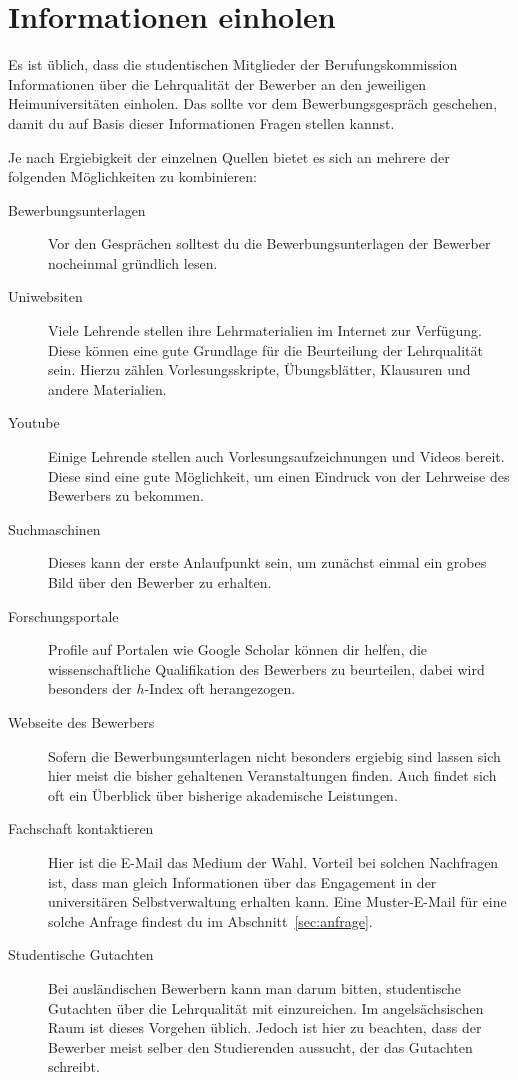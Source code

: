 \section{Informationen einholen}
Es ist üblich, dass die studentischen Mitglieder der Berufungskommission Informationen über die Lehrqualität der Bewerber an den jeweiligen Heimuniversitäten einholen.
Das sollte vor dem Bewerbungsgespräch geschehen, damit du auf Basis dieser Informationen Fragen stellen kannst.

Je nach Ergiebigkeit der einzelnen Quellen bietet es sich an mehrere der folgenden Möglichkeiten zu kombinieren:
\begin{description}
      \item [Bewerbungsunterlagen]
            Vor den Gesprächen solltest du die Bewerbungsunterlagen der Bewerber nocheinmal gründlich lesen.
      \item [Uniwebsiten]
            Viele Lehrende stellen ihre Lehrmaterialien im Internet zur Verfügung. Diese können eine gute Grundlage für die Beurteilung der Lehrqualität sein. Hierzu zählen Vorlesungsskripte, Übungsblätter, Klausuren und andere Materialien.
      \item [Youtube]
            Einige Lehrende stellen auch Vorlesungsaufzeichnungen und Videos bereit. Diese sind eine gute Möglichkeit, um einen Eindruck von der Lehrweise des Bewerbers zu bekommen.
      \item [Suchmaschinen]
            Dieses kann der erste Anlaufpunkt sein, um zunächst einmal ein grobes Bild über den Bewerber zu erhalten.
      \item [Forschungsportale]
            Profile auf Portalen wie Google Scholar können dir helfen, die wissenschaftliche Qualifikation des Bewerbers zu beurteilen, dabei wird besonders der $h$-Index oft herangezogen.
      \item [Webseite des Bewerbers]
            Sofern die Bewerbungsunterlagen nicht besonders ergiebig sind lassen sich hier meist die bisher gehaltenen Veranstaltungen finden. Auch findet sich oft ein Überblick über bisherige akademische Leistungen.
      \item [Fachschaft kontaktieren]
            Hier ist die E-Mail das Medium der Wahl. Vorteil bei solchen Nachfragen ist, dass man gleich Informationen über das Engagement in der universitären Selbstverwaltung erhalten kann. Eine Muster-E-Mail für eine solche Anfrage findest du im Abschnitt~\ref{sec:anfrage}.
      \item [Studentische Gutachten]
            Bei ausländischen Bewerbern kann man darum bitten, studentische Gutachten über die Lehrqualität mit einzureichen. Im angelsächsischen Raum ist dieses Vorgehen üblich. Jedoch ist hier zu beachten, dass der Bewerber meist selber den Studierenden aussucht, der das Gutachten schreibt.
\end{description}

